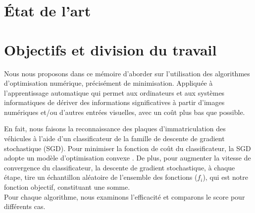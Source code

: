 		
			
	\section{État de l'art}
	
	\section{Objectifs et division du travail}
		
		Nous nous proposons dans ce mémoire d'aborder sur l'utilisation des algorithmes d'optimisation numérique, précisément de minimisation. Appliquée à l'apprentissage automatique qui permet aux ordinateurs et aux systèmes informatiques de dériver des informations significatives à partir d'images numériques et/ou d'autres entrées visuelles, avec un coût plus bas que possible.  
		
		En fait, nous faisons la reconnaissance des plaques d’immatriculation des véhicules à l'aide d’un classificateur de la famille de descente de gradient stochastique (SGD). Pour minimiser la fonction de coût du classificateur, la SGD adopte un modèle d'optimisation convexe \cite{deepa2021ai}. De plus, pour augmenter la vitesse de convergence du classificateur, la descente de gradient stochastique, à chaque étape, tire un échantillon aléatoire de l'ensemble des fonctions ($f_i$), qui est notre fonction objectif, constituant une somme.\\
		Pour chaque algorithme, nous examinons l'efficacité et comparons le score pour différents cas.
		

